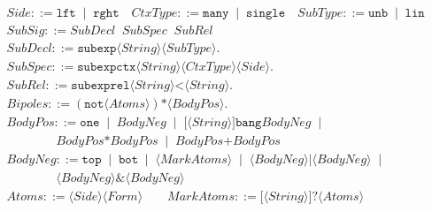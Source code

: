 \documentclass{llncs}
\newcommand{\tup}[1]{\langle#1\rangle}
\begin{document}
\begin{figure}[t]
{\small
\[
\begin{array}{lcl}
Side ::= \texttt{lft} \;\;|\;\; \texttt{rght} \quad 
CtxType ::=  \texttt{many} \;\;|\;\; \texttt{single} \quad
SubType ::=  \texttt{unb} \;\;|\;\; \texttt{lin} \\[2pt]
SubSig ::= SubDecl \;\; SubSpec \;\; SubRel \\[2pt]
SubDecl ::= \texttt{subexp} \tup{String} \tup{SubType}.\\[2pt]
SubSpec ::= \texttt{subexpctx} \tup{String} \tup{CtxType} \tup{Side}.\\[2pt]
SubRel ::= \texttt{subexprel} \tup{String} \texttt{<} \tup{String}. \\[2pt]
Bipoles ::= (\texttt{not} \tup{Atoms}) \texttt{*} \tup{BodyPos}. \\[2pt]
BodyPos ::=\texttt{one} \;\;|\;\; BodyNeg \;\;|\;\; \texttt{[}\tup{String}\texttt{]bang} BodyNeg \;\;|\;\;\\ 
        \qquad\qquad BodyPos \texttt{*} BodyPos \;\;|\;\; BodyPos \texttt{+} BodyPos \\[2pt]
BodyNeg ::= \texttt{top} \;\;|\;\; \texttt{bot} \;\;|\;\; \tup{MarkAtoms} \;\;|\;\; \tup{BodyNeg}|\tup{BodyNeg} \;\;|\;\; \\
        \qquad \qquad \tup{BodyNeg} \texttt{\&} \tup{BodyNeg}\\[2pt]
Atoms ::=\tup{Side} \tup{Form} \qquad MarkAtoms ::=  \texttt{[}\tup{String}\texttt{]?} \tup{Atoms} \\
\end{array}
\]
}
\end{figure}
\end{document}
